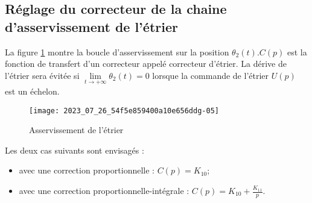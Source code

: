 \subsection{\label{sec:II.B} Réglage du correcteur de la chaine d'asservissement de l'étrier}
La figure \ref{fig_ccspsi2022:08} montre la boucle d'asservissement sur la position $\theta_{2}(t) . C(p)$ est la fonction de transfert d'un correcteur appelé correcteur d'étrier. La dérive de l'étrier sera évitée si $\lim\limits_{t \rightarrow+\infty} \theta_{2}(t)=0$ lorsque la commande de l'étrier $U(p)$ est un échelon.

\begin{figure}[!h]
\centering
\texttt{[image: 2023\_07\_26\_54f5e859400a10e656ddg-05]}
\caption{\label{fig_ccspsi2022:08}Asservissement de l'étrier}
\end{figure}

Les deux cas suivants sont envisagés :

\begin{itemize}
  \item avec une correction proportionnelle : $C(p)=K_{10}$;
  \item avec une correction proportionnelle-intégrale : $C(p)=K_{10}+\frac{K_{11}}{p}$.
\end{itemize}



